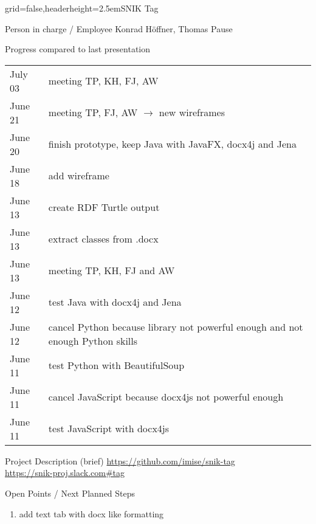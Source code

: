 \documentclass[]{kiesgrube}
\begin{document}
\begin{poster}%
{grid=false,headerheight=2.5em}{}{SNIK Tag}{}

\begin{posterbox}[name=person,column=0,row=0]{Person in charge / Employee}
Konrad Höffner, Thomas Pause
\end{posterbox}
\begin{posterbox}[name=progress,below=person]{Progress compared to last presentation}
\begin{tabulary}{\textwidth}{lL}
July 03	&meeting TP, KH, FJ, AW\\
June 21	&meeting TP, FJ, AW $\rightarrow$ new wireframes\\
June 20	&finish prototype, keep Java with JavaFX, docx4j and Jena\\
June 18 &add wireframe\\
June 13 &create RDF Turtle output\\
June 13	&extract classes from .docx\\
June 13 &meeting TP, KH, FJ and AW\\
June 12	&test Java with docx4j and Jena\\
June 12	&cancel Python because library not powerful enough and not enough Python skills\\
June 11	&test Python with BeautifulSoup\\
June 11	&cancel JavaScript because docx4js not powerful enough\\
June 11	&test JavaScript with docx4js\\
\end{tabulary}
\end{posterbox}
\begin{posterbox}[name=description,column=1,row=0]{Project Description (brief)}
\url{https://github.com/imise/snik-tag}\\
\url{https://snik-proj.slack.com#tag}
\end{posterbox}
\begin{posterbox}[name=open,column=1,below=description]{Open Points / Next Planned Steps}
\begin{enumerate}
\item add text tab with docx like formatting 

\end{enumerate}
\end{posterbox}
\end{poster}
\end{document}
